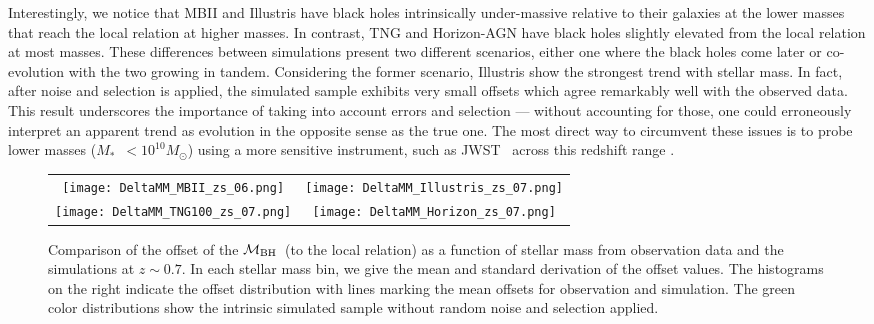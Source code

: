 \documentclass[twocolumn]{aastex631}
\def\smass{{$M_*$}}
\def\mbh{$\mathcal M_{\rm BH}$}
\begin{document}
Interestingly, we notice that MBII and Illustris have black holes intrinsically under-massive relative to their galaxies at the lower masses that reach the local relation at higher masses. In contrast, TNG and Horizon-AGN have black holes slightly elevated from the local relation at most masses. These differences between simulations present two different scenarios, either one where the black holes come later or co-evolution with the two growing in tandem. Considering the former scenario, Illustris show the strongest trend with stellar mass. In fact, after noise and selection is applied, the simulated sample exhibits very small offsets which agree remarkably well with the observed data. This result underscores the importance of taking into account errors and selection --- without accounting for those, one could erroneously interpret an apparent trend as evolution in the opposite sense as the true one.  The most direct way to circumvent these issues is to probe lower masses (\smass\  $<10^{10}M_{\odot}$) using a more sensitive instrument, such as JWST~\citep{Habouzit2022} across this redshift range \citep[see also][]{2011MNRAS.417.2085V}.

\begin{figure*}
\centering
\begin{tabular}{c c}
\hspace*{-0.5cm} 
{\texttt{[image: DeltaMM\_MBII\_zs\_06.png]}}&
\hspace*{-0.3cm} 
{\texttt{[image: DeltaMM\_Illustris\_zs\_07.png]}}\\
\hspace*{-0.5cm} 
{\texttt{[image: DeltaMM\_TNG100\_zs\_07.png]}}&
\hspace*{-0.3cm} 
{\texttt{[image: DeltaMM\_Horizon\_zs\_07.png]}}\\
\end{tabular}
\caption{\label{fig:deltaMM} Comparison of the offset of the \mbh\ (to the local relation) as a function of stellar mass from observation data and the simulations at $z\sim0.7$. In each stellar mass bin, we give the mean and standard derivation of the offset values. The histograms on the right indicate the offset distribution with lines marking the mean offsets for observation and simulation. The green color distributions show the intrinsic simulated sample without random noise and selection applied.
}
\end{figure*} 
\end{document}
